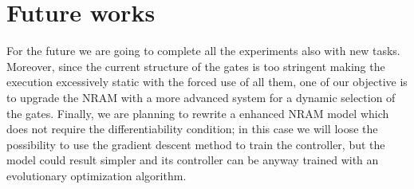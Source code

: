 \section{Future works}
For the future we are going to complete all the experiments also with new tasks. Moreover, since the current structure of the gates is too stringent making the execution excessively static with the forced use of all them, one of our objective is to upgrade the NRAM with a more advanced system for a dynamic selection of the gates. Finally, we are planning to rewrite a enhanced NRAM model which does not require the differentiability condition; in this case we will loose the possibility to use the gradient descent method to train the controller, but the model could result simpler and its controller can be anyway trained with an evolutionary optimization algorithm.